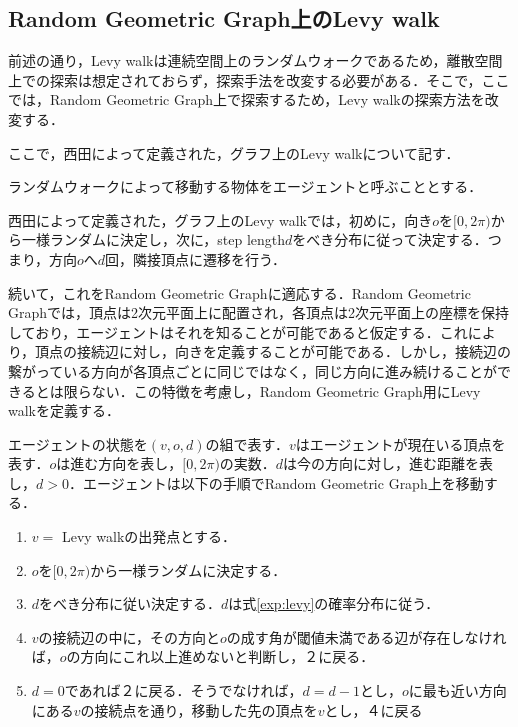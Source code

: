\documentclass[11pt]{jreport}
\begin{document}
\subsection{Random Geometric Graph上のLevy walk}
前述の通り，Levy walkは連続空間上のランダムウォークであるため，離散空間上での探索は想定されておらず，探索手法を改変する必要がある．そこで，ここでは，Random Geometric Graph上で探索するため，Levy walkの探索方法を改変する．
\par ここで，西田\cite{nishida}によって定義された，グラフ上のLevy walkについて記す．
\par ランダムウォークによって移動する物体をエージェントと呼ぶこととする．
\par 西田\cite{nishida}によって定義された，グラフ上のLevy walkでは，初めに，向き$o$を$[0, 2\pi)$から一様ランダムに決定し，次に，step length$d$をべき分布に従って決定する．つまり，方向$o$へ$d$回，隣接頂点に遷移を行う．
\par 続いて，これをRandom Geometric Graphに適応する．Random Geometric Graphでは，頂点は2次元平面上に配置され，各頂点は2次元平面上の座標を保持しており，エージェントはそれを知ることが可能であると仮定する．これにより，頂点の接続辺に対し，向きを定義することが可能である．しかし，接続辺の繋がっている方向が各頂点ごとに同じではなく，同じ方向に進み続けることができるとは限らない．この特徴を考慮し，Random Geometric Graph用にLevy walkを定義する．
\par エージェントの状態を$(v, o ,d)$の組で表す．$v$はエージェントが現在いる頂点を表す．$o$は進む方向を表し，$[0, 2\pi)$の実数．$d$は今の方向に対し，進む距離を表し，$d>0$．エージェントは以下の手順でRandom Geometric Graph上を移動する．

\begin{enumerate}
	\item $v=$ Levy walkの出発点とする．
    \item $o$を$[0, 2\pi)$から一様ランダムに決定する．
    \item $d$をべき分布に従い決定する．$d$は式\ref{exp:levy}の確率分布に従う．
    \item $v$の接続辺の中に，その方向と$o$の成す角が閾値未満である辺が存在しなければ，$o$の方向にこれ以上進めないと判断し，２に戻る．
    \item $d=0$であれば２に戻る．そうでなければ，$d=d-1$とし，$o$に最も近い方向にある$v$の接続点を通り，移動した先の頂点を$v$とし，４に戻る
\end{enumerate}
\end{document}
